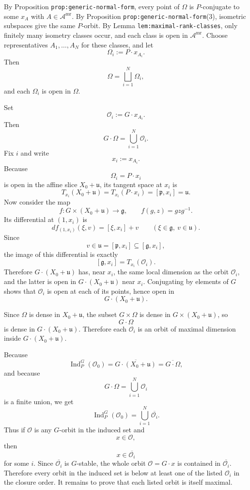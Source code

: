 \documentclass[
  11pt,
]{article}
\begin{document}
By Proposition \texttt{prop:generic-normal-form}, every point of
\(\Omega\) is \(P\)-conjugate to some \(x_A\) with
\(A\in \mathscr A^{\mathrm{mr}}\). By Proposition
\texttt{prop:generic-normal-form}(3), isometric subspaces give the same
\(P\)-orbit. By Lemma \texttt{lem:maximal-rank-classes}, only finitely
many isometry classes occur, and each class is open in
\(\mathscr A^{\mathrm{mr}}\). Choose representatives \(A_1,\dots,A_N\)
for these classes, and let \[
\Omega_i:=P\cdot x_{A_i}.
\] Then \[
\Omega=\bigsqcup_{i=1}^N \Omega_i,
\] and each \(\Omega_i\) is open in \(\Omega\).

Set \[
\mathcal O_i:=G\cdot x_{A_i}.
\] Then \[
G\cdot \Omega = \bigcup_{i=1}^N \mathcal O_i.
\] Fix \(i\) and write \[
x_i:=x_{A_i}.
\] Because \[
\Omega_i=P\cdot x_i
\] is open in the affine slice \(X_0+\mathfrak u\), its tangent space at
\(x_i\) is \[
T_{x_i}(X_0+\mathfrak u)=T_{x_i}(P\cdot x_i)=[\mathfrak p,x_i]=\mathfrak u.
\] Now consider the map \[
f:G\times (X_0+\mathfrak u)\to \mathfrak g,
\qquad
f(g,z)=gzg^{-1}.
\] Its differential at \((1,x_i)\) is \[
df_{(1,x_i)}(\xi,v)=[\xi,x_i]+v
\qquad
(\xi\in \mathfrak g,\ v\in \mathfrak u).
\] Since \[
v\in \mathfrak u=[\mathfrak p,x_i]\subseteq [\mathfrak g,x_i],
\] the image of this differential is exactly \[
[\mathfrak g,x_i]=T_{x_i}(\mathcal O_i).
\] Therefore \(G\cdot (X_0+\mathfrak u)\) has, near \(x_i\), the same
local dimension as the orbit \(\mathcal O_i\), and the latter is open in
\(G\cdot (X_0+\mathfrak u)\) near \(x_i\). Conjugating by elements of
\(G\) shows that \(\mathcal O_i\) is open at each of its points, hence
open in \[
G\cdot (X_0+\mathfrak u).
\]

Since \(\Omega\) is dense in \(X_0+\mathfrak u\), the subset
\(G\times \Omega\) is dense in \(G\times (X_0+\mathfrak u)\), so \[
G\cdot \Omega
\] is dense in \(G\cdot (X_0+\mathfrak u)\). Therefore each
\(\mathcal O_i\) is an orbit of maximal dimension inside
\(G\cdot (X_0+\mathfrak u)\).

Because \[
\operatorname{Ind}_P^G(\mathcal O_0)
=\overline{G\cdot(X_0+\mathfrak u)}
=\overline{G\cdot \Omega},
\] and because \[
G\cdot \Omega=\bigcup_{i=1}^N \mathcal O_i
\] is a finite union, we get \[
\operatorname{Ind}_P^G(\mathcal O_0)
=\bigcup_{i=1}^N \overline{\mathcal O_i}.
\] Thus if \(\mathcal O\) is any \(G\)-orbit in the induced set and \[
x\in \mathcal O,
\] then \[
x\in \overline{\mathcal O_i}
\] for some \(i\). Since \(\overline{\mathcal O_i}\) is \(G\)-stable,
the whole orbit \(\mathcal O=G\cdot x\) is contained in
\(\overline{\mathcal O_i}\). Therefore every orbit in the induced set is
below at least one of the listed \(\mathcal O_i\) in the closure order.
It remains to prove that each listed orbit is itself maximal.
\end{document}
